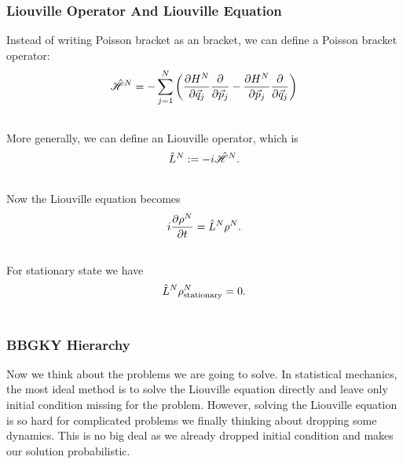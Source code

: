 \documentclass[letterpaper,10pt,english]{sphinxmanual}
\begin{document}
\subsubsection{Liouville Operator And Liouville Equation}
\label{nonequilibrium/week8:index-0}\label{nonequilibrium/week8:liouville-operator-and-liouville-equation}
Instead of writing Poisson bracket as an bracket, we can define a Poisson bracket operator:
\begin{gather}
\begin{split}\hat{\mathscr H}^N = - \sum_{j=1}^N \left( \frac{\partial H^N}{\partial \vec q_j}\frac{\partial}{\partial \vec p_j} - \frac{\partial H^N}{\partial \vec p_j}\frac{\partial}{\partial \vec q_j} \right)\end{split}\notag\\\begin{split}\end{split}\notag
\end{gather}
More generally, we can define an Liouville operator, which is
\begin{gather}
\begin{split}\hat L^N := -i \hat{\mathscr H}^N  .\end{split}\notag\\\begin{split}\end{split}\notag
\end{gather}
Now the Liouville equation becomes
\begin{gather}
\begin{split}i \frac{\partial \rho^N}{\partial t} = \hat L^N \rho^N  .\end{split}\notag\\\begin{split}\end{split}\notag
\end{gather}
For stationary state we have
\begin{gather}
\begin{split}\hat L^N \rho^N _ {\mathrm{stationary}} = 0 .\end{split}\notag\\\begin{split}\end{split}\notag
\end{gather}

\subsubsection{BBGKY Hierarchy}
\label{nonequilibrium/week8:bbgky-hierarchy}
Now we think about the problems we are going to solve. In statistical mechanics, the most ideal method is to solve the Liouville equation directly and leave only initial condition missing for the problem. However, solving the Liouville equation is so hard for complicated problems we finally thinking about dropping some dynamics. This is no big deal as we already dropped initial condition and makes our solution probabilistic.
\end{document}
